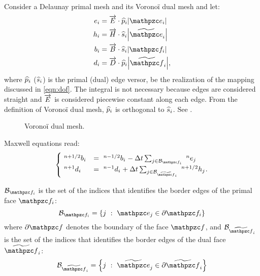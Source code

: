 Consider a Delaunay primal mesh and its Vorono\"i dual mesh and let:
\begin{equation} \label{eqn:voronoi_dof} \begin{aligned}
e_i & = \DotProd{\E}{\Versor{p}_i} \Measure{\Line{e}_i} \\
h_i & = \DotProd{\H}{\Versor{s}_i} \Measure{\DualLine{e}_i} \\
b_i & = \DotProd{\B}{\Versor{s}_i} \Measure{\Surface{f}_i} \\
d_i & = \DotProd{\D}{\Versor{p}_i} \Measure{\DualSurface{f}_i},
\end{aligned} \end{equation}
where $\widehat{p}_i$ ($\widehat{s}_i$) is the primal (dual) edge
versor, be the realization of the mapping discussed in
\eqref{eqn:dof}. The integral is not necessary because edges are
considered straight and $\overrightarrow{E}$ is considered piecewise constant along each
edge. From the definition of Vorono\"i dual mesh, $\widehat{p}_i$ is
orthogonal to $\widehat{s}_i$. See .

\begin{figure}[htbp]
  \begin{center}
  \end{center}
  \caption{Vorono\"i dual mesh.}
  \label{fig:voronoi}
\end{figure}

Maxwell equations read:
\begin{equation} \label{eqn:voronoi_maxwell} \begin{cases}
    \Disc{b_i}{}{n+1/2} & = \Disc{b_i}{}{n-1/2} - \deltat \sum_{j \in
    \Set{B}_{\Surface{f}_i}} \Disc{e_j}{}{n} \\
    \Disc{d_i}{}{n+1} & = \Disc{d_i}{}{n-1} + \deltat \sum_{j \in
    \Set{B}_{\DualSurface{f}_i}} \Disc{h_j}{}{n+1/2}.
  \end{cases} \end{equation}

$\Set{B}_{\Surface{f}_i}$ is the set of the indices that identifies the border
edges of the primal face $\Surface{f}_i$:
\begin{equation*}
  \Set{B}_{\Surface{f}_i} = \left\{ j\ :\ \Line{e}_j \in \partial \Surface{f}_i \right\}
\end{equation*}
where $\partial \Surface{f}$ denotes the boundary of the face $\Surface{f}$, and
$\Set{B}_{\DualSurface{f}_i}$ is the set of the indices that identifies the border
edges of the dual face $\DualSurface{f}_i$:
\begin{equation*}
  \Set{B}_{\DualSurface{f}_i} = \left\{ j\ :\ \DualLine{e}_j \in \partial \DualSurface{f}_i \right\}
\end{equation*}

